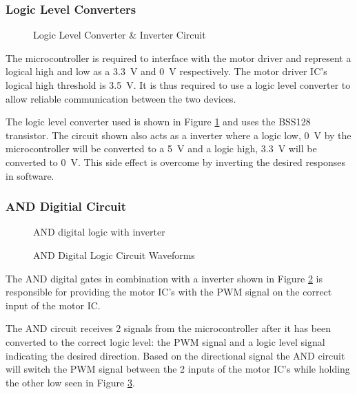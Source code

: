 \subsubsection{Logic Level Converters}
\begin{figure}[h]
	\centering
	
	\caption{Logic Level Converter \& Inverter Circuit}
	\label{fig:interterCirc}
\end{figure}


The microcontroller is required to interface with the motor driver and represent a logical high and low as a \SI{3.3}{V} and \SI{0}{V} respectively. The motor driver IC's logical high threshold is \SI{3.5}{V}. It is thus required to use a logic level converter to allow reliable communication between the two devices.

The logic level converter used is shown in Figure \ref{fig:interterCirc} and uses the BSS128 transistor. The circuit shown also acts as a inverter where a logic low, \SI{0}{V} by the microcontroller will be converted to a \SI{5}{V} and a logic high, \SI{3.3}{V} will be converted to \SI{0}{V}. This side effect is overcome by inverting the desired responses in software.


\subsubsection{AND Digitial Circuit}
\begin{figure}[h]
	\centering
	
	\caption{AND digital logic with inverter}
	\label{fig:andCircuit}
\end{figure}

\begin{figure}[h]
	\centering
	
	\caption{AND Digital Logic Circuit Waveforms}
	\label{fig:andCircuit_waveform}
\end{figure}

The AND digital gates in combination with a inverter shown in Figure \ref{fig:andCircuit} is responsible for providing the motor IC's with the PWM signal on the correct input of the motor IC.

The AND circuit receives 2 signals from the microcontroller  after it has been converted to the correct logic level: the PWM signal and a logic level signal indicating the desired direction. Based on the directional signal the AND circuit will switch the PWM signal between the 2 inputs of the motor IC's while holding the other low seen in Figure \ref{fig:andCircuit_waveform}.

